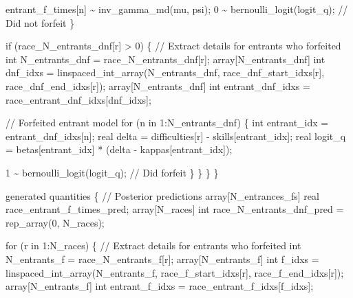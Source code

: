 \documentclass[
  letterpaper,
  DIV=11,
  numbers=noendperiod]{scrartcl}
\newenvironment{Shaded}{\begin{snugshade}}{\end{snugshade}}
\newcommand{\CommentTok}[1]{\textcolor[rgb]{0.37,0.37,0.37}{#1}}
\newcommand{\ControlFlowTok}[1]{\textcolor[rgb]{0.00,0.23,0.31}{#1}}
\newcommand{\DataTypeTok}[1]{\textcolor[rgb]{0.68,0.00,0.00}{#1}}
\newcommand{\DecValTok}[1]{\textcolor[rgb]{0.68,0.00,0.00}{#1}}
\newcommand{\KeywordTok}[1]{\textcolor[rgb]{0.00,0.23,0.31}{#1}}
\newcommand{\NormalTok}[1]{\textcolor[rgb]{0.00,0.23,0.31}{#1}}
\begin{document}
\begin{codelisting}
\begin{Shaded}
\begin{Highlighting}[]
\NormalTok{      entrant\_f\_times[n] \textasciitilde{} inv\_gamma\_md(mu, psi);}
      \DecValTok{0}\NormalTok{ \textasciitilde{} bernoulli\_logit(logit\_q); }\CommentTok{// Did not forfeit}
\NormalTok{    \}}

    \ControlFlowTok{if}\NormalTok{ (race\_N\_entrants\_dnf[r] \textgreater{} }\DecValTok{0}\NormalTok{) \{}
      \CommentTok{// Extract details for entrants who forfeited}
      \DataTypeTok{int}\NormalTok{ N\_entrants\_dnf = race\_N\_entrants\_dnf[r];}
      \DataTypeTok{array}\NormalTok{[N\_entrants\_dnf]}
        \DataTypeTok{int}\NormalTok{ dnf\_idxs = linspaced\_int\_array(N\_entrants\_dnf,}
\NormalTok{                                           race\_dnf\_start\_idxs[r],}
\NormalTok{                                           race\_dnf\_end\_idxs[r]);}
      \DataTypeTok{array}\NormalTok{[N\_entrants\_dnf]}
        \DataTypeTok{int}\NormalTok{ entrant\_dnf\_idxs = race\_entrant\_dnf\_idxs[dnf\_idxs];}

      \CommentTok{// Forfeited entrant model}
      \ControlFlowTok{for}\NormalTok{ (n }\ControlFlowTok{in} \DecValTok{1}\NormalTok{:N\_entrants\_dnf) \{}
        \DataTypeTok{int}\NormalTok{ entrant\_idx = entrant\_dnf\_idxs[n];}
        \DataTypeTok{real}\NormalTok{ delta = difficulties[r] {-} skills[entrant\_idx];}
        \DataTypeTok{real}\NormalTok{ logit\_q = betas[entrant\_idx] * (delta {-} kappas[entrant\_idx]);}

        \DecValTok{1}\NormalTok{ \textasciitilde{} bernoulli\_logit(logit\_q); }\CommentTok{// Did forfeit}
\NormalTok{      \}}
\NormalTok{    \}}
\NormalTok{  \}}
\NormalTok{\}}

\KeywordTok{generated quantities}\NormalTok{ \{}
  \CommentTok{// Posterior predictions}
  \DataTypeTok{array}\NormalTok{[N\_entrances\_fs] }\DataTypeTok{real}\NormalTok{ race\_entrant\_f\_times\_pred;}
  \DataTypeTok{array}\NormalTok{[N\_races] }\DataTypeTok{int}\NormalTok{ race\_N\_entrants\_dnf\_pred = rep\_array(}\DecValTok{0}\NormalTok{, N\_races);}

  \ControlFlowTok{for}\NormalTok{ (r }\ControlFlowTok{in} \DecValTok{1}\NormalTok{:N\_races) \{}
    \CommentTok{// Extract details for entrants who forfeited}
    \DataTypeTok{int}\NormalTok{ N\_entrants\_f = race\_N\_entrants\_f[r];}
    \DataTypeTok{array}\NormalTok{[N\_entrants\_f] }\DataTypeTok{int}\NormalTok{ f\_idxs = linspaced\_int\_array(N\_entrants\_f,}
\NormalTok{                                                         race\_f\_start\_idxs[r],}
\NormalTok{                                                         race\_f\_end\_idxs[r]);}
    \DataTypeTok{array}\NormalTok{[N\_entrants\_f] }\DataTypeTok{int}\NormalTok{ entrant\_f\_idxs = race\_entrant\_f\_idxs[f\_idxs];}


\end{Highlighting}
\end{Shaded}
\end{codelisting}
\end{document}

